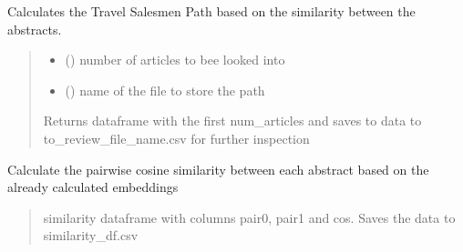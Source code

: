 \documentclass[letterpaper,10pt,english]{sphinxmanual}
\begin{document}
\begin{fulllineitems}
\begin{fulllineitems}
\label{\detokenize{BeeLitReview:BeeLitReview.BeeLitReview.calculate_TSP}}
\pysigstartsignatures
{}
\pysigstopsignatures
\sphinxAtStartPar
Calculates the Travel Salesmen Path based on the similarity between the abstracts.
\begin{quote}\begin{description}
\begin{itemize}
\item {} 
\sphinxAtStartPar
{} () \textendash{} number of articles to bee looked into

\item {} 
\sphinxAtStartPar
{} () \textendash{} name of the file to store the path

\end{itemize}

\sphinxAtStartPar
Returns dataframe with the first num\_articles and saves to data to to\_review\_file\_name.csv for further inspection

\end{description}\end{quote}

\end{fulllineitems}


\begin{fulllineitems}
\label{\detokenize{BeeLitReview:BeeLitReview.BeeLitReview.calculate_similarity}}
\pysigstartsignatures
{}
\pysigstopsignatures
\sphinxAtStartPar
Calculate the pairwise cosine similarity between each abstract based on the already calculated embeddings
\begin{quote}\begin{description}
\sphinxAtStartPar
similarity dataframe with columns pair0, pair1 and cos. Saves the data to similarity\_df.csv


\end{description}
\end{quote}
\end{fulllineitems}
\end{fulllineitems}
\end{document}

